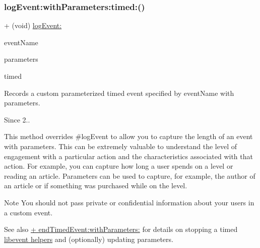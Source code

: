 \subsubsection{\texorpdfstring{log\+Event\+:with\+Parameters\+:timed\+:()}{logEvent:withParameters:timed:()}}
{\footnotesize\ttfamily + (void) \hyperlink{interfaceFlurry_a5433aaf247d3e14120ba05877d034a61}{log\+Event\+:} \begin{DoxyParamCaption}\item[{(N\+S\+String $\ast$)}]{event\+Name }\item[{withParameters:(N\+S\+Dictionary $\ast$)}]{parameters }\item[{timed:(B\+O\+OL)}]{timed }\end{DoxyParamCaption}}



Records a custom parameterized timed event specified by {\ttfamily event\+Name} with {\ttfamily parameters}. 

\begin{DoxySince}{Since}
2..
\end{DoxySince}
This method overrides \#log\+Event to allow you to capture the length of an event with parameters. This can be extremely valuable to understand the level of engagement with a particular action and the characteristics associated with that action. For example, you can capture how long a user spends on a level or reading an article. Parameters can be used to capture, for example, the author of an article or if something was purchased while on the level.

\begin{DoxyNote}{Note}
You should not pass private or confidential information about your users in a custom event.
\end{DoxyNote}
\begin{DoxySeeAlso}{See also}
\hyperlink{interfaceFlurry_a9540add7440d1b716bfb8fb8efa85801}{+ end\+Timed\+Event\+:with\+Parameters\+:} for details on stopping a timed \hyperlink{group__event}{libevent helpers} and (optionally) updating parameters.
\end{DoxySeeAlso}

